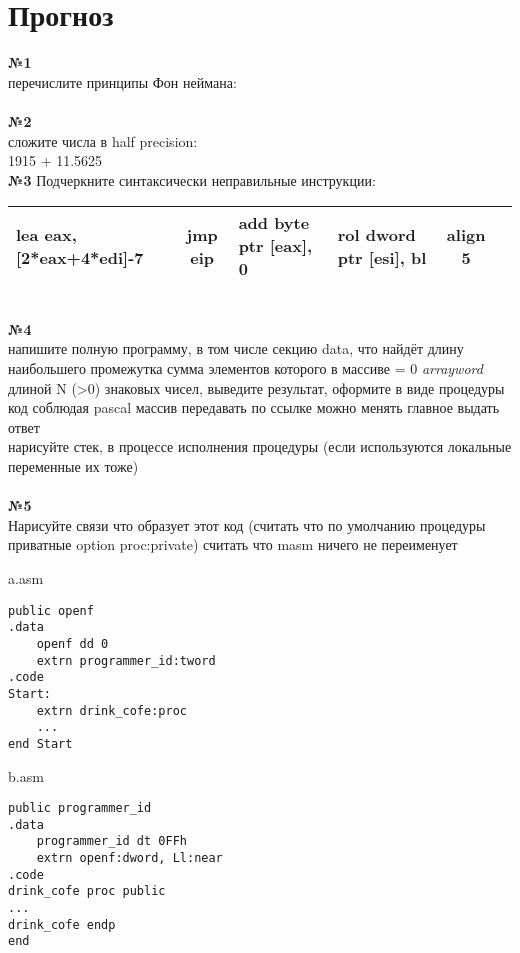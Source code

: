 \documentclass[a4paper,10pt]{article}
\begin{document}
\section*{Прогноз}
\textbf{№1} \\
перечислите принципы Фон неймана: \\
\vspace{0.3cm} \\
\textbf{№2} \\
сложите числа в half precision: \\
1915 + 11.5625
\vspace{0.3cm} \\
\textbf{№3}
Подчеркните синтаксически неправильные инструкции: \\
\begin{tabularx}{\textwidth}{|X|c|X|X|c|c|}
    \hline
    lea eax, [2*eax+4*edi]-7 & jmp eip & add byte ptr [eax], 0 & rol dword ptr [esi], bl & align 5\\
    \hline
\end{tabularx}
\vspace{0.2cm} \\
\textbf{№4} \\
напишите полную программу, в том числе секцию data, что найдёт длину наибольшего промежутка сумма элементов которого в массиве = 0 \textit{arrayword} длиной N (>0)  знаковых чисел, выведите результат, оформите в виде процедуры код соблюдая pascal массив передавать по ссылке можно менять главное выдать ответ\\
нарисуйте стек, в процессе исполнения процедуры (если используются локальные переменные их тоже) \\
\vspace{0.3cm} \\
\textbf{№5} \\
Нарисуйте связи что образует этот код (считать что по умолчанию процедуры приватные option proc:private) считать что masm ничего не переименует
\begin{multicols}{2}
a.asm
\begin{verbatim}
public openf
.data
    openf dd 0
    extrn programmer_id:tword
.code
Start:
    extrn drink_cofe:proc
    ...
end Start
\end{verbatim}
\columnbreak
b.asm
\begin{verbatim}
public programmer_id
.data
    programmer_id dt 0FFh
    extrn openf:dword, Ll:near
.code
drink_cofe proc public
...
drink_cofe endp
end
\end{verbatim}
\end{multicols}
\end{document}
